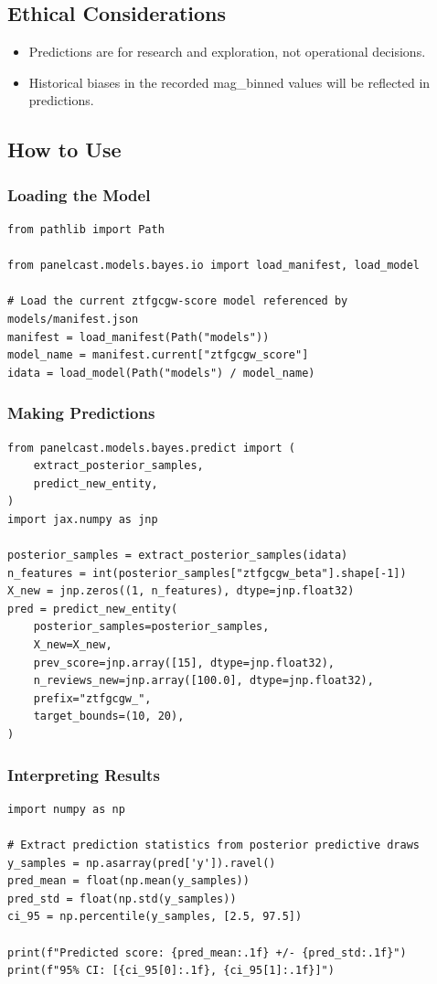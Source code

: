 \documentclass{article}
\begin{document}
\subsection*{Ethical Considerations}
\begin{itemize}
  \item Predictions are for research and exploration, not operational decisions.
  \item Historical biases in the recorded mag\_binned values will be reflected in predictions.
\end{itemize}

\subsection*{How to Use}

\subsubsection*{Loading the Model}
\begin{lstlisting}
from pathlib import Path

from panelcast.models.bayes.io import load_manifest, load_model

# Load the current ztfgcgw-score model referenced by models/manifest.json
manifest = load_manifest(Path("models"))
model_name = manifest.current["ztfgcgw_score"]
idata = load_model(Path("models") / model_name)
\end{lstlisting}

\subsubsection*{Making Predictions}
\begin{lstlisting}
from panelcast.models.bayes.predict import (
    extract_posterior_samples,
    predict_new_entity,
)
import jax.numpy as jnp

posterior_samples = extract_posterior_samples(idata)
n_features = int(posterior_samples["ztfgcgw_beta"].shape[-1])
X_new = jnp.zeros((1, n_features), dtype=jnp.float32)
pred = predict_new_entity(
    posterior_samples=posterior_samples,
    X_new=X_new,
    prev_score=jnp.array([15], dtype=jnp.float32),
    n_reviews_new=jnp.array([100.0], dtype=jnp.float32),
    prefix="ztfgcgw_",
    target_bounds=(10, 20),
)
\end{lstlisting}

\subsubsection*{Interpreting Results}
\begin{lstlisting}
import numpy as np

# Extract prediction statistics from posterior predictive draws
y_samples = np.asarray(pred['y']).ravel()
pred_mean = float(np.mean(y_samples))
pred_std = float(np.std(y_samples))
ci_95 = np.percentile(y_samples, [2.5, 97.5])

print(f"Predicted score: {pred_mean:.1f} +/- {pred_std:.1f}")
print(f"95% CI: [{ci_95[0]:.1f}, {ci_95[1]:.1f}]")
\end{lstlisting}
\end{document}

